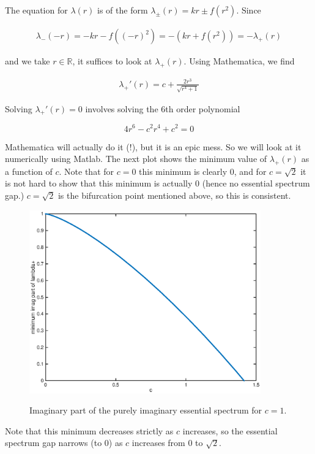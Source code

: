 \documentclass[12pt]{article}
\def\R{{\mathbb R}}
\begin{document}
The equation for $\lambda(r)$ is of the form $\lambda_\pm(r) = k r \pm f(r^2)$. Since

\begin{align*}
\lambda_-(-r) = -kr - f((-r)^2) = -(kr + f(r^2)) = -\lambda_+(r)
\end{align*} 

and we take $r \in \R$, it suffices to look at $\lambda_+(r)$. Using Mathematica, we find

\begin{align*}
\lambda_+'(r) = c+\frac{2 r^3}{\sqrt{r^4+1}}
\end{align*}

Solving $\lambda_+'(r) = 0$ involves solving the 6th order polynomial

\[
4 r^6 - c^2 r^4 + c^2 = 0
\]

Mathematica will actually do it (!), but it is an epic mess. So we will look at it numerically using Matlab. The next plot shows the minimum value of $\lambda_+(r)$ as a function of $c$. Note that for $c = 0$ this minimum is clearly $0$, and for $c = \sqrt{2}$ it is not hard to show that this minimum is actually 0 (hence no essential spectrum gap.) $c = \sqrt{2}$ is the bifurcation point mentioned above, so this is consistent.

\begin{figure}[H]
\centering
\includegraphics[width=10cm]{minlambdaplus.eps}
\label{fig:essspec1}
\caption{Imaginary part of the purely imaginary essential spectrum for $c = 1$.}
\end{figure}

Note that this minimum decreases strictly as $c$ increases, so the essential spectrum gap narrows (to 0) as $c$ increases from 0 to $\sqrt{2}$.\\
\end{document}
